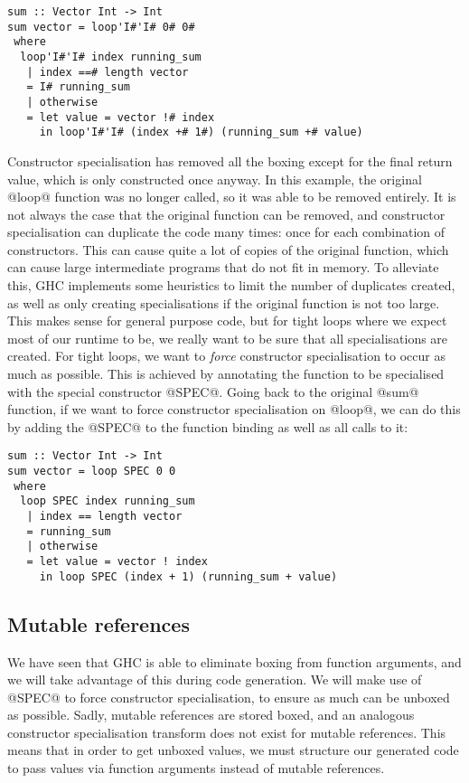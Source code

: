 \begin{lstlisting}
sum :: Vector Int -> Int
sum vector = loop'I#'I# 0# 0#
 where
  loop'I#'I# index running_sum
   | index ==# length vector
   = I# running_sum
   | otherwise
   = let value = vector !# index
     in loop'I#'I# (index +# 1#) (running_sum +# value)
\end{lstlisting}

Constructor specialisation has removed all the boxing except for the final return value, which is only constructed once anyway.
In this example, the original @loop@ function was no longer called, so it was able to be removed entirely.
It is not always the case that the original function can be removed, and constructor specialisation can duplicate the code many times: once for each combination of constructors.
This can cause quite a lot of copies of the original function, which can cause large intermediate programs that do not fit in memory.
To alleviate this, GHC implements some heuristics to limit the number of duplicates created, as well as only creating specialisations if the original function is not too large.
This makes sense for general purpose code, but for tight loops where we expect most of our runtime to be, we really want to be sure that all specialisations are created.
For tight loops, we want to \emph{force} constructor specialisation to occur as much as possible.
This is achieved by annotating the function to be specialised with the special constructor @SPEC@.
Going back to the original @sum@ function, if we want to force constructor specialisation on @loop@, we can do this by adding the @SPEC@ to the function binding as well as all calls to it:

\begin{lstlisting}
sum :: Vector Int -> Int
sum vector = loop SPEC 0 0
 where
  loop SPEC index running_sum
   | index == length vector
   = running_sum
   | otherwise
   = let value = vector ! index
     in loop SPEC (index + 1) (running_sum + value)
\end{lstlisting}

\subsection{Mutable references}
\label{ss:extraction:mutablerefs}

We have seen that GHC is able to eliminate boxing from function arguments, and we will take advantage of this during code generation.
We will make use of @SPEC@ to force constructor specialisation, to ensure as much can be unboxed as possible.
Sadly, mutable references are stored boxed, and an analogous constructor specialisation transform does not exist for mutable references.
This means that in order to get unboxed values, we must structure our generated code to pass values via function arguments instead of mutable references.

